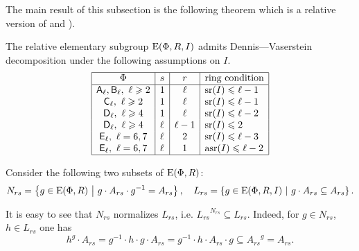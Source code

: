 The main result of this subsection is the following theorem which is a relative version of \cite[Lemma~2.1]{ST76} and \cite[Theorem~2.5]{St78}).
\begin{thm}\label{thm:DennisVaserstein}
The relative elementary subgroup $\operatorname{E}(\Phi, R, I)$ admits Dennis---Vaserstein decomposition under the following assumptions on $I$.
\[\begin{array}{|c|l|c|l|}
\hline \Phi & s & r & \text{ring condition} \\ \hline
\mathsf{A}_\ell, \mathsf{B}_\ell,\ \ell\geqslant 2 & 1 & \ell & \operatorname{sr}(I) \leqslant \ell-1 \\     
\mathsf{C}_\ell,\ \ell \geqslant 2          & 1 & \ell & \operatorname{sr}(I) \leqslant \ell-1 \\
\mathsf{D}_\ell,\ \ell\geqslant 4           & 1 & \ell & \operatorname{sr}(I) \leqslant \ell-2 \\ 
\mathsf{D}_\ell,\ \ell\geqslant 4           & \ell & \ell-1 & \operatorname{sr}(I) \leqslant 2 \\
\mathsf{E}_\ell,\ \ell=6,7             & \ell & 2 & \operatorname{sr}(I) \leqslant \ell-3 \\ 
\mathsf{E}_\ell,\ \ell=6,7             & \ell & 1 & \operatorname{asr}(I)\leqslant \ell-2 \\ \hline
\end{array}\]
\end{thm}
Consider the following two subsets of $\operatorname{E}(\Phi, R)$:
\[ N_{rs} = \left\{ g\in \operatorname{E}(\Phi, R)\ \middle|\ g \cdot A_{rs} \cdot g^{-1} = A_{rs} \right\}, \quad
   L_{rs}=  \left\{ g\in \operatorname{E}(\Phi, R, I)\ \middle|\ g \cdot A_{rs} \subseteq A_{rs} \right\}. \]

It is easy to see that $N_{rs}$ normalizes $L_{rs}$, i.e. ${L_{rs}}^{N_{rs}} \subseteq L_{rs}$. 
Indeed, for $g\in N_{rs}$, $h\in L_{rs}$ one has
$$h^g \cdot A_{rs} = g^{-1} \cdot h \cdot g \cdot A_{rs} = g^{-1} \cdot h \cdot A_{rs} \cdot g \subseteq {A_{rs}}^g = A_{rs}.$$

